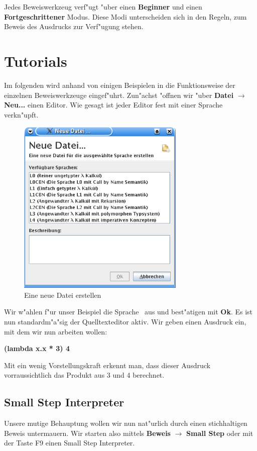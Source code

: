 Jedes Beweiswerkzeug verf"ugt "uber einen {\bf Beginner} und einen
{\bf Fortgeschrittener} Modus. Diese Modi unterscheiden sich in den
Regeln, zum Beweis des Ausdrucks zur Verf"ugung stehen.

\section {Tutorials}
Im folgenden wird anhand von einigen Beispielen in die
Funktionsweise der einzelnen Beweiswerkzeuge eingef"uhrt. Zun"achst
"offnen wir "uber {\bf Datei} $\rightarrow$ {\bf Neu...} einen
Editor. Wie gesagt ist jeder Editor fest mit einer Sprache
verkn"upft.

\begin{figure}[h]
\begin{center}
\includegraphics[width=8cm]{images/new-dialog.png}
\caption{Eine neue Datei erstellen}
\end{center}
\end{figure}

Wir w"ahlen f"ur unser Beispiel die Sprache \LONE\ aus und best"atigen
mit {\bf Ok}. Es ist nun standardm"a"sig der Quelltexteditor aktiv.
Wir geben einen Ausdruck ein, mit dem wir nun arbeiten wollen:

{\bf (lambda x.x * 3) 4}

Mit ein wenig Vorstellungskraft erkennt man, dass dieser Ausdruck
vorraussichtlich das Produkt aus 3 und 4 berechnet.


\subsection{Small Step Interpreter}
Unsere mutige Behauptung wollen wir nun nat"urlich durch einen
stichhaltigen Beweis untermauern. Wir starten also mittels {\bf
Beweis} $\rightarrow$ {\bf Small Step} oder mit der Taste F9 einen
Small Step Interpreter.

